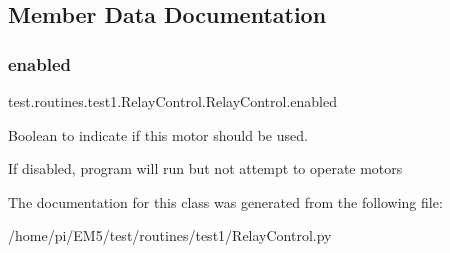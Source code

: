 \subsection{Member Data Documentation}
\mbox{\label{classtest_1_1routines_1_1test1_1_1RelayControl_1_1RelayControl_ad45edce55069af8a6ae4d3ba866243ab}} 
\subsubsection{\texorpdfstring{enabled}{enabled}}
{\footnotesize\ttfamily test.\+routines.\+test1.\+Relay\+Control.\+Relay\+Control.\+enabled}



Boolean to indicate if this motor should be used. 

If disabled, program will run but not attempt to operate motors 

The documentation for this class was generated from the following file\+:\begin{DoxyCompactItemize}
\item 
/home/pi/\+E\+M5/test/routines/test1/Relay\+Control.\+py\end{DoxyCompactItemize}
